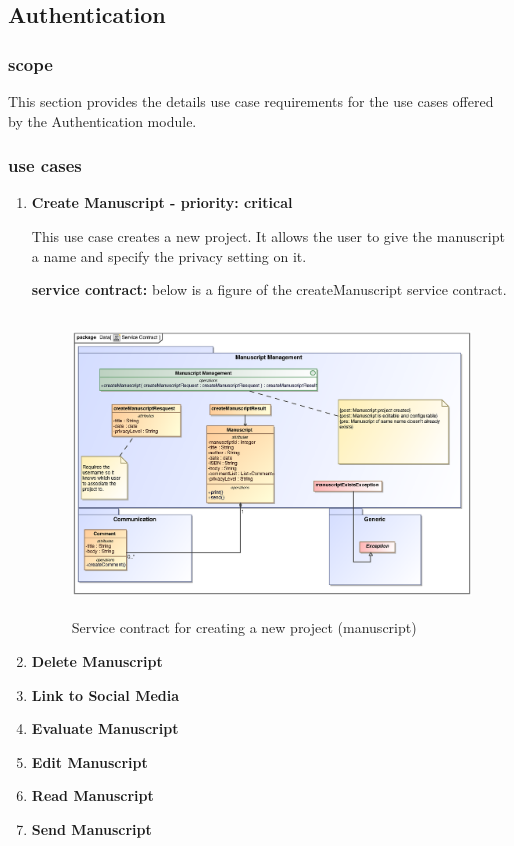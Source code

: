 \documentclass[12pt]{article}
\begin{document}
\subsection{Authentication}

\subsubsection{scope}
\par{This section provides the details use case requirements for the use cases offered by the Authentication
module.}

\subsubsection{use cases}

\begin{enumerate}
\item \textbf{Create Manuscript - priority: critical}\\
\par{This use case creates a new project. It allows the user to give the manuscript a name and specify the privacy setting on it. }

\textbf{service contract:} below is a figure of the createManuscript service contract.

\begin{figure}[h]
\includegraphics[height=300px, width=500px]{epsImages/ManuscriptManagement/createManuscriptServiceContract.eps}
\caption{Service contract for creating a new project (manuscript)}
\end{figure}

\item \textbf{Delete Manuscript}
\item \textbf{Link to Social Media}
\item \textbf{Evaluate Manuscript}
\item \textbf{Edit Manuscript}
\item \textbf{Read Manuscript}
\item \textbf{Send Manuscript}
\end{enumerate}
\end{document}
